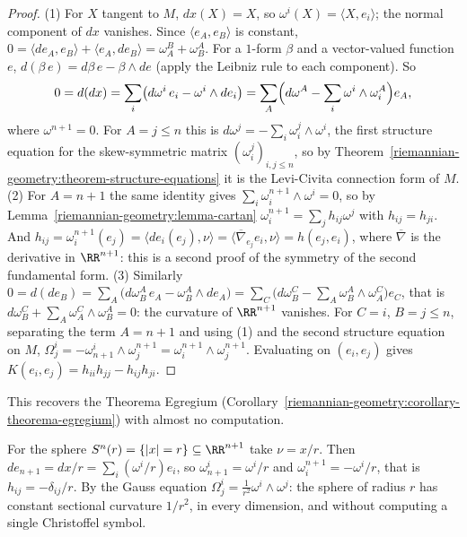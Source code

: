 \begin{proof}
(1) For $X$ tangent to $M$, $dx(X) = X$, so $\omega^i(X) = \langle X, e_i\rangle$; the normal component of $dx$ vanishes. Since $\langle e_A, e_B\rangle$ is constant,
$0 = \langle de_A, e_B\rangle + \langle e_A, de_B\rangle = \omega^B_A + \omega^A_B$. For a $1$-form $\beta$ and a vector-valued function $e$, $d(\beta\,e) = d\beta\,e - \beta \wedge de$ (apply the
Leibniz rule to each component). So
\[
0 = d(dx) = \sum_i\bigl(d\omega^i\,e_i - \omega^i \wedge de_i\bigr) = \sum_A\Bigl(d\omega^A - \sum_i\omega^i \wedge \omega^A_i\Bigr)e_A,
\]
where $\omega^{n+1} = 0$. For $A = j \leq n$ this is $d\omega^j = -\sum_i\omega^j_i \wedge \omega^i$, the first structure equation for the skew-symmetric matrix $(\omega^j_i)_{i,j \leq n}$, so by
Theorem~\ref{riemannian-geometry:theorem-structure-equations} it is the Levi-Civita connection form of $M$.
(2) For $A = n + 1$ the same identity gives $\sum_i\omega^{n+1}_i \wedge \omega^i = 0$, so by Lemma~\ref{riemannian-geometry:lemma-cartan} $\omega^{n+1}_i = \sum_jh_{ij}\omega^j$ with
$h_{ij} = h_{ji}$. And $h_{ij} = \omega^{n+1}_i(e_j) = \langle de_i(e_j), \nu\rangle = \langle\overline\nabla_{e_j}e_i, \nu\rangle = h(e_j, e_i)$, where $\overline\nabla$ is the derivative in $\RR^{n+1}$: this is a second
proof of the symmetry of the second fundamental form.
(3) Similarly $0 = d(de_B) = \sum_A\bigl(d\omega^A_B\,e_A - \omega^A_B \wedge de_A\bigr) = \sum_C\bigl(d\omega^C_B - \sum_A\omega^A_B \wedge \omega^C_A\bigr)e_C$, that is
$d\omega^C_B + \sum_A\omega^C_A \wedge \omega^A_B = 0$: the curvature of $\RR^{n+1}$ vanishes. For $C = i$, $B = j \leq n$, separating the term $A = n + 1$ and using (1) and the second structure
equation on $M$, $\Omega^i_j = -\omega^i_{n+1} \wedge \omega^{n+1}_j = \omega^{n+1}_i \wedge \omega^{n+1}_j$. Evaluating on $(e_i, e_j)$ gives $K(e_i, e_j) = h_{ii}h_{jj} - h_{ij}h_{ji}$.
\end{proof}

This recovers the Theorema Egregium (Corollary~\ref{riemannian-geometry:corollary-theorema-egregium}) with almost no computation.

\begin{example}\label{riemannian-geometry:example-sphere-frames}
For the sphere $S^n(r) = \{|x| = r\} \subseteq \RR^{n+1}$ take $\nu = x/r$. Then $de_{n+1} = dx/r = \sum_i(\omega^i/r)e_i$, so $\omega^i_{n+1} = \omega^i/r$ and $\omega^{n+1}_i = -\omega^i/r$, that is
$h_{ij} = -\delta_{ij}/r$. By the Gauss equation $\Omega^i_j = \frac{1}{r^2}\omega^i \wedge \omega^j$: the sphere of radius $r$ has constant sectional curvature $1/r^2$, in every dimension, and
without computing a single Christoffel symbol.
\end{example}

